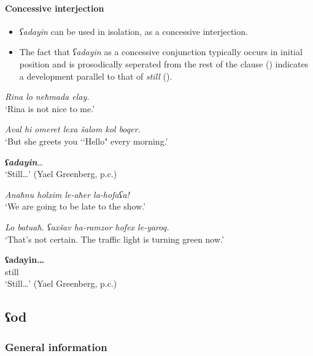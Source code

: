 \paragraph{Concessive interjection}
\label{appendixHebrewConcessiveInterjection}
\begin{itemize}
	\item \textit{ʕadayin} can be used in isolation, as a concessive interjection.
	\item The fact that \textit{ʕadayin} as a concessive conjunction typically occurs in initial position and is prosodically seperated from the rest of the clause () indicates a development parallel to that of  \textit{still} ().
\end{itemize}

\begin{exe}
	\ex
		\begin{xlist}
		\textit{Rina lo neħmada elay.}\\
					\lq Rina is not nice to me.'
	
		  \textit{Aval hi omeret lexa šalom kol boqer.}\\
		\lq But she greets you \lq\lq Hello" every morning.\rq

		\textit{ \textbf{ʕadayin}…}\\
		\lq Still…' (Yael Greenberg, p.c.)
	\end{xlist}
	\ex
	\begin{xlist}
		 \textit{Anaħnu holxim le-aħer la-hofaʕa!}\\
		\lq We are going to be late to the show.'

		 \textit{Lo batuaħ. ʕaxšav ha-ramzor hofex le-yaroq.}\\
		\lq That's not certain. The traffic light is turning green now.'
	
		 \gll \textbf{ʕadayin…}\\
		still\\
		\glt \lq Still…' (Yael Greenberg, p.c.)
	\end{xlist}

\end{exe}

\subsection{ʕod}
\label{appendixHebrewOd}

\subsubsection{General information}
\largerpage

